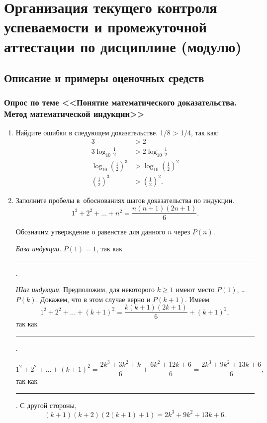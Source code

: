\documentclass{rpd}
\begin{document}
\section{Организация текущего контроля успеваемости и промежуточной аттестации по дисциплине (модулю)}

    \subsection{Описание и примеры оценочных средств}


    \subsubsection*{Опрос по теме <<Понятие математического доказательства. Метод математической индукции>>}

        \begin{enumerate}
        \item
        Найдите ошибки в следующем доказательстве. 1/8 > 1/4, так как:
        \begin{align*}
            3 &> 2\\
            3 \log_{10}\frac{1}{2} &> 2 \log_{10}\frac{1}{2} \\
            \log_{10}\left(\frac{1}{2}\right)^3 &> \log_{10}\left(\frac{1}{2}\right)^2\\
            \left(\frac{1}{2}\right)^3 &> \left(\frac{1}{2}\right)^2.
        \end{align*}
        \item
        Заполните пробелы в~обоснованиях шагов доказательства по индукции.
        \[ 1^2 + 2^2 + \ldots + n^2 = \frac{n(n+1)(2n+1)}{6}.\]

        Обозначим утверждение о равенстве для данного $n$ через $P(n)$.

        \emph{База индукции}. $P(1) = 1$, так как \rule{3cm}{.6pt}.

        \emph{Шаг индукции}. Предположим, для некоторого $k \geqslant 1$ имеют место $P(1)$,  \ldots $P(k)$. Докажем, что в этом случае верно и $P(k+1)$. Имеем
        \[ 1^2 + 2^2 + \ldots + (k+1)^2 = \frac{k(k+1)(2k+1)}{6} + (k+1)^2,\]
        так как \rule{3cm}{.6pt}.

        \[ 1^2 + 2^2 + \ldots + (k+1)^2 = \frac{2k^3 + 3k^2 + k}{6} + \frac{6k^2 + 12k + 6}{6} = \frac{2k^3 + 9k^2 + 13k + 6}{6},\]
        так как \rule{3cm}{.6pt}. С другой стороны,
        \[
        (k+1)(k+2)(2(k+1)+1) = 2k^3 + 9k^2 + 13k + 6.
        \]
        \end{enumerate}
        
\end{document}
